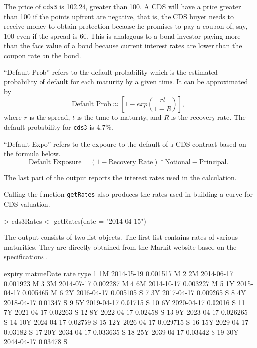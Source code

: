 \documentclass[a4paper]{article}
\renewenvironment{Schunk}{\vspace{\topsep}}{\vspace{\topsep}}
\begin{document}
The price of \texttt{cds3} is 102.24, greater than 100. A CDS will
have a price greater than 100 if the points upfront are negative, that
is, the CDS buyer needs to receive money to obtain protection because
he promises to pay a coupon of, say, 100 even if the spread is
60. This is analogous to a bond investor paying more than the face
value of a bond because current interest rates are lower than the
coupon rate on the bond.

``Default Prob'' refers to the default probability which is the
estimated probability of default for each maturity by a given time. It
can be approximated by
\begin{equation}
  \text{Default Prob} \approx \left [1 - exp \left (\frac{rt}{1-R} \right ) \right ], \nonumber
\end{equation}
where $r$ is the spread, $t$ is the time to maturity, and $R$ is the
recovery rate. The default probability for \texttt{cds3} is 4.7\%.

``Default Expo'' refers to the expoure to the default of a CDS
contract based on the formula below.
\begin{equation}
  \text{Default Exposure} = (1 - \text{Recovery Rate})*\text{Notional}
  - \text{Principal}. \nonumber
\end{equation}

The last part of the output reports the interest rates used in the
calculation.

Calling the function \texttt{getRates} also produces the rates used in
building a curve for CDS valuation. 

\begin{Schunk}
\begin{Sinput}
> cds3Rates <- getRates(date = "2014-04-15")
\end{Sinput}
\end{Schunk}

The output consists of two list objects. The first list contains rates
of various maturities. They are directly obtained from the Markit
website based on the specifications \citep{rates}.

\begin{Schunk}
\begin{Soutput}
   expiry matureDate     rate type
1      1M 2014-05-19 0.001517    M
2      2M 2014-06-17 0.001923    M
3      3M 2014-07-17 0.002287    M
4      6M 2014-10-17 0.003227    M
5      1Y 2015-04-17 0.005465    M
6      2Y 2016-04-17 0.005105    S
7      3Y 2017-04-17 0.009265    S
8      4Y 2018-04-17  0.01347    S
9      5Y 2019-04-17  0.01715    S
10     6Y 2020-04-17  0.02016    S
11     7Y 2021-04-17  0.02263    S
12     8Y 2022-04-17  0.02458    S
13     9Y 2023-04-17 0.026265    S
14    10Y 2024-04-17  0.02759    S
15    12Y 2026-04-17 0.029715    S
16    15Y 2029-04-17  0.03182    S
17    20Y 2034-04-17 0.033635    S
18    25Y 2039-04-17  0.03442    S
19    30Y 2044-04-17  0.03478    S
\end{Soutput}
\end{Schunk}
\end{document}
